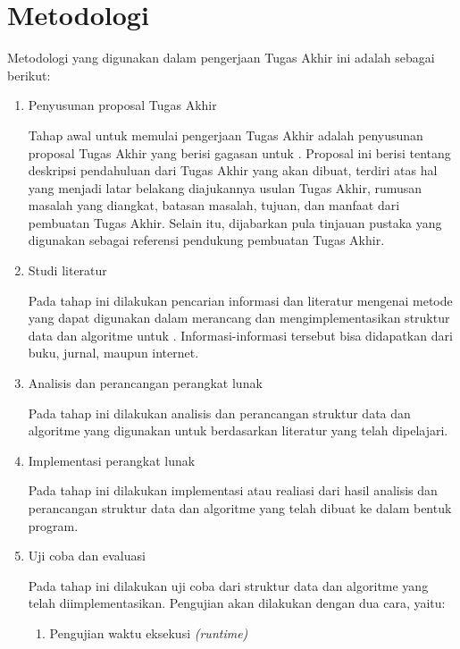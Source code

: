 \section{Metodologi}
\tab Metodologi yang digunakan dalam pengerjaan Tugas Akhir ini adalah sebagai berikut:
\begin{enumerate}
	
	\item Penyusunan proposal Tugas Akhir
	
	\tab Tahap awal untuk memulai pengerjaan Tugas Akhir adalah penyusunan proposal Tugas Akhir yang berisi gagasan untuk \problem. Proposal ini berisi tentang deskripsi pendahuluan dari Tugas Akhir yang akan dibuat, terdiri atas hal yang menjadi latar belakang diajukannya usulan Tugas Akhir, rumusan masalah yang diangkat, batasan masalah, tujuan, dan manfaat dari pembuatan Tugas Akhir. Selain itu, dijabarkan pula tinjauan pustaka yang digunakan sebagai referensi pendukung pembuatan Tugas Akhir.	
	
	\item Studi literatur
	
	\tab Pada tahap ini dilakukan pencarian informasi dan literatur mengenai metode yang dapat digunakan dalam merancang dan mengimplementasikan struktur data dan algoritme untuk \problem. Informasi-informasi tersebut bisa didapatkan dari buku, jurnal, maupun internet.
	
	\item Analisis dan perancangan perangkat lunak
	
	\tab Pada tahap ini dilakukan analisis dan perancangan struktur data dan algoritme yang digunakan untuk \problem berdasarkan literatur yang telah
	dipelajari.
	
	\item Implementasi perangkat lunak
	
	\tab Pada tahap ini dilakukan implementasi atau realiasi dari hasil analisis dan perancangan struktur data dan algoritme yang telah dibuat ke dalam bentuk program.
	
	\item Uji coba dan evaluasi
	
	\tab Pada tahap ini dilakukan uji coba dari struktur data dan algoritme yang telah diimplementasikan. Pengujian akan dilakukan dengan dua cara, yaitu:
	
	\begin{enumerate}
		\item Pengujian waktu eksekusi \textit{(runtime)}
		

\end{enumerate}
\end{enumerate}
